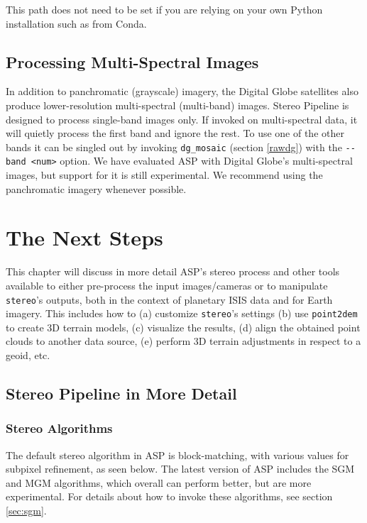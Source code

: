 This path does not need to be set if you are relying on your own
Python installation such as from Conda.

\section{Processing Multi-Spectral Images}

In addition to panchromatic (grayscale) imagery, the Digital Globe
satellites also produce lower-resolution multi-spectral (multi-band)
images. Stereo Pipeline is designed to process single-band images
only. If invoked on multi-spectral data, it will quietly process the
first band and ignore the rest. To use one of the other
bands it can be singled out by invoking \texttt{dg\_mosaic}
(section \ref{rawdg}) with the \texttt{-\/-band <num>} option. We have
evaluated ASP with Digital Globe's multi-spectral images, but
support for it is still experimental. We recommend using the
panchromatic imagery whenever possible.

\chapter{The Next Steps}
\label{nextsteps}

This chapter will discuss in more detail ASP's stereo process and other
tools available to either pre-process the input images/cameras or to
manipulate \texttt{stereo}'s outputs, both in the context of planetary
ISIS data and for Earth imagery. This includes how to (a) customize
\texttt{stereo}'s settings (b) use \texttt{point2dem} to create 3D
terrain models, (c) visualize the results, (d) align the obtained point
clouds to another data source, (e) perform 3D terrain adjustments in
respect to a geoid, etc.


\section{Stereo Pipeline in More Detail}
\label{running-stereo}

\subsection{Stereo Algorithms}

The default stereo algorithm in ASP is block-matching, with various values for subpixel refinement, as seen below. The latest version of ASP includes the SGM and MGM algorithms, which overall can perform better, but are more experimental. For details about how to invoke these algorithms, see section \ref{sec:sgm}.

